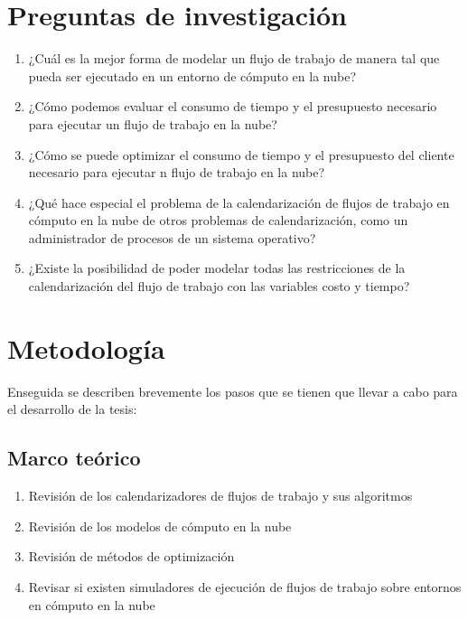 \documentclass[letterpaper, 12pt]{report}
\begin{document}
\section*{Preguntas de investigación}
\begin{enumerate}
\item ¿Cuál es la mejor forma de modelar un flujo de trabajo de manera tal que pueda ser ejecutado en un entorno de cómputo en la nube?
\item ¿Cómo podemos evaluar el consumo de tiempo y el presupuesto necesario para ejecutar un flujo de trabajo en la nube?
\item ¿Cómo se puede optimizar el consumo de tiempo y el presupuesto del cliente necesario para ejecutar n flujo de trabajo en la nube?
\item ¿Qué hace especial el problema de la calendarización de flujos de trabajo en cómputo en la nube de otros problemas de calendarización, como un administrador de procesos de un sistema operativo? %
\item ¿Existe la posibilidad de poder modelar todas las restricciones de la calendarización del flujo  de trabajo con las variables costo y tiempo?
\end{enumerate}


\section*{Metodología}
Enseguida se describen brevemente los pasos que se tienen que llevar a cabo para el desarrollo de la tesis:
\subsection*{Marco teórico}
\begin{enumerate}
\item Revisión de los calendarizadores de flujos de trabajo y sus algoritmos
\item Revisión de los modelos de cómputo en la nube
\item Revisión de métodos de optimización
\item Revisar si existen simuladores de ejecución de flujos de trabajo sobre entornos en cómputo en la nube
\end{enumerate}
\end{document}
